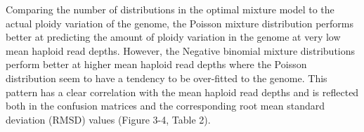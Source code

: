 \documentclass[11pt]{article}
\begin{document}
Comparing the number of distributions in the optimal mixture model to the actual ploidy variation of the genome, the Poisson mixture distribution performs better at predicting the amount of ploidy variation in the genome at very low mean haploid read depths. However, the Negative binomial mixture distributions perform better at higher mean haploid read depths where the Poisson distribution seem to have a tendency to be over-fitted to the genome. This pattern has a clear correlation with the mean haploid read depths and is reflected both in the confusion matrices  and the corresponding root mean standard deviation (RMSD) values (Figure 3-4, Table 2). 
\end{document}
